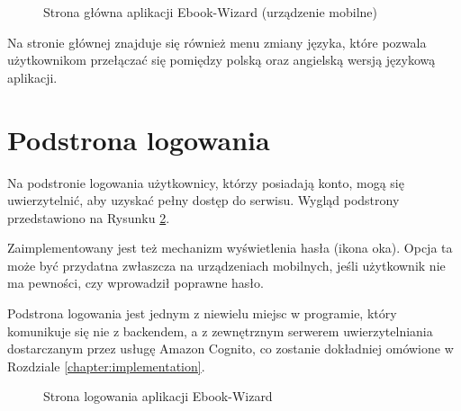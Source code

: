 \begin{figure}[h]
    \centering
    \setlength{\fboxsep}{0pt}
    \setlength{\fboxrule}{0.4pt}
    \caption{Strona główna aplikacji Ebook-Wizard (urządzenie mobilne)}
    \label{fig:page_main_mobile}
\end{figure}

Na stronie głównej znajduje się również menu zmiany języka, które pozwala użytkownikom przełączać się pomiędzy polską oraz angielską wersją językową aplikacji.

\section{Podstrona logowania}

Na podstronie logowania użytkownicy, którzy posiadają konto, mogą się uwierzytelnić, aby uzyskać pełny dostęp do serwisu. Wygląd podstrony przedstawiono na Rysunku \ref{fig:page_login}.

Zaimplementowany jest też mechanizm wyświetlenia hasła (ikona oka). Opcja ta może być przydatna zwłaszcza na urządzeniach mobilnych, jeśli użytkownik nie ma pewności, czy wprowadził poprawne hasło.

Podstrona logowania jest jednym z niewielu miejsc w programie, który komunikuje się nie z backendem, a z zewnętrznym serwerem uwierzytelniania dostarczanym przez usługę Amazon Cognito, co zostanie dokładniej omówione w Rozdziale \ref{chapter:implementation}.

\begin{figure}[h]
    \centering
    \setlength{\fboxsep}{0pt}
    \setlength{\fboxrule}{0.4pt}
    \caption{Strona logowania aplikacji Ebook-Wizard}
    \label{fig:page_login}
\end{figure}

